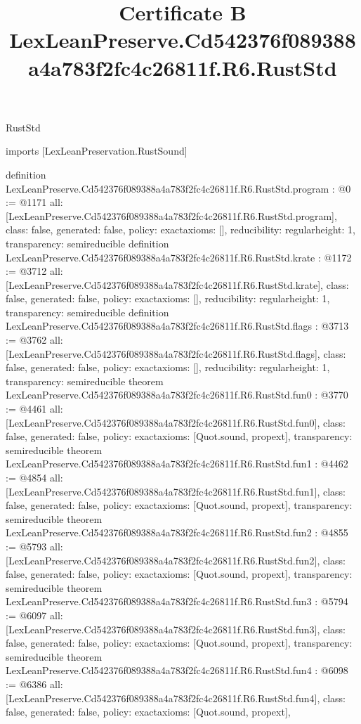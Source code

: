 \begin{lexlean}{RustStd}
\title{Certificate B LexLeanPreserve.Cd542376f089388a4a783f2fc4c26811f.R6.RustStd}
\begin{coremodule}
imports [LexLeanPreservation.RustSound]

definition LexLeanPreserve.Cd542376f089388a4a783f2fc4c26811f.R6.RustStd.program : @0 := @1171 {
  all: [LexLeanPreserve.Cd542376f089388a4a783f2fc4c26811f.R6.RustStd.program],
  class: false,
  generated: false,
  policy: exact{axioms: []},
  reducibility: regular{height: 1},
  transparency: semireducible
}
definition LexLeanPreserve.Cd542376f089388a4a783f2fc4c26811f.R6.RustStd.krate : @1172 := @3712 {
  all: [LexLeanPreserve.Cd542376f089388a4a783f2fc4c26811f.R6.RustStd.krate],
  class: false,
  generated: false,
  policy: exact{axioms: []},
  reducibility: regular{height: 1},
  transparency: semireducible
}
definition LexLeanPreserve.Cd542376f089388a4a783f2fc4c26811f.R6.RustStd.flags : @3713 := @3762 {
  all: [LexLeanPreserve.Cd542376f089388a4a783f2fc4c26811f.R6.RustStd.flags],
  class: false,
  generated: false,
  policy: exact{axioms: []},
  reducibility: regular{height: 1},
  transparency: semireducible
}
theorem LexLeanPreserve.Cd542376f089388a4a783f2fc4c26811f.R6.RustStd.fun0 : @3770 := @4461 {
  all: [LexLeanPreserve.Cd542376f089388a4a783f2fc4c26811f.R6.RustStd.fun0],
  class: false,
  generated: false,
  policy: exact{axioms: [Quot.sound, propext]},
  transparency: semireducible
}
theorem LexLeanPreserve.Cd542376f089388a4a783f2fc4c26811f.R6.RustStd.fun1 : @4462 := @4854 {
  all: [LexLeanPreserve.Cd542376f089388a4a783f2fc4c26811f.R6.RustStd.fun1],
  class: false,
  generated: false,
  policy: exact{axioms: [Quot.sound, propext]},
  transparency: semireducible
}
theorem LexLeanPreserve.Cd542376f089388a4a783f2fc4c26811f.R6.RustStd.fun2 : @4855 := @5793 {
  all: [LexLeanPreserve.Cd542376f089388a4a783f2fc4c26811f.R6.RustStd.fun2],
  class: false,
  generated: false,
  policy: exact{axioms: [Quot.sound, propext]},
  transparency: semireducible
}
theorem LexLeanPreserve.Cd542376f089388a4a783f2fc4c26811f.R6.RustStd.fun3 : @5794 := @6097 {
  all: [LexLeanPreserve.Cd542376f089388a4a783f2fc4c26811f.R6.RustStd.fun3],
  class: false,
  generated: false,
  policy: exact{axioms: [Quot.sound, propext]},
  transparency: semireducible
}
theorem LexLeanPreserve.Cd542376f089388a4a783f2fc4c26811f.R6.RustStd.fun4 : @6098 := @6386 {
  all: [LexLeanPreserve.Cd542376f089388a4a783f2fc4c26811f.R6.RustStd.fun4],
  class: false,
  generated: false,
  policy: exact{axioms: [Quot.sound, propext]},
}
\end{coremodule}
\end{lexlean}
